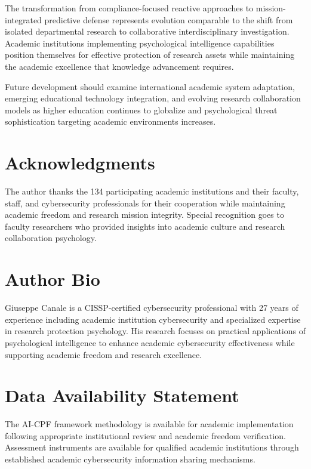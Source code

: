 \documentclass[10pt, twocolumn]{article}
\begin{document}
The transformation from compliance-focused reactive approaches to mission-integrated predictive defense represents evolution comparable to the shift from isolated departmental research to collaborative interdisciplinary investigation. Academic institutions implementing psychological intelligence capabilities position themselves for effective protection of research assets while maintaining the academic excellence that knowledge advancement requires.

Future development should examine international academic system adaptation, emerging educational technology integration, and evolving research collaboration models as higher education continues to globalize and psychological threat sophistication targeting academic environments increases.

\section*{Acknowledgments}

The author thanks the 134 participating academic institutions and their faculty, staff, and cybersecurity professionals for their cooperation while maintaining academic freedom and research mission integrity. Special recognition goes to faculty researchers who provided insights into academic culture and research collaboration psychology.

\section*{Author Bio}

Giuseppe Canale is a CISSP-certified cybersecurity professional with 27 years of experience including academic institution cybersecurity and specialized expertise in research protection psychology. His research focuses on practical applications of psychological intelligence to enhance academic cybersecurity effectiveness while supporting academic freedom and research excellence.

\section*{Data Availability Statement}

The AI-CPF framework methodology is available for academic implementation following appropriate institutional review and academic freedom verification. Assessment instruments are available for qualified academic institutions through established academic cybersecurity information sharing mechanisms.
\end{document}

